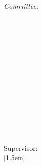 \begin{titlepage}
	\begin{minipage}[t]{.27\textwidth}
		\raggedleft
		\textit{Committee:}
	\end{minipage}
	\hspace*{15pt}
	\begin{minipage}[t]{.65\textwidth}
		{\Large \thesisReviewerOneTitle\ \thesisReviewerOne} \\
	  	{\small \thesisReviewerOneDepartment} \\[-1mm]
		{\small \thesisReviewerOneUniversity}
	\end{minipage} \\[5mm]

	\begin{minipage}[t]{.27\textwidth}
		\raggedleft
		\textit{}
	\end{minipage}
	\hspace*{15pt}
	\begin{minipage}[t]{.65\textwidth}
		{\Large \thesisReviewerTwoTitle\ \thesisReviewerTwo} \\
	  	{\small \thesisReviewerTwoDepartment} \\[-1mm]
		{\small \thesisReviewerTwoUniversity}
	\end{minipage} \\[20mm]

    \centering
	\thesisDate \\

\end{titlepage}


\hfill
\vfill
{
	\small
	\textbf{\thesisAuthor} \\
	\textit{\thesisTitle} \\
    \thesisDate \\
    Supervisor: \thesisSupervisorTitle\ \thesisSupervisor\\
	[1.5em]
	\textbf{\thesisUniversity} \\
	\thesisUniversityInstitute \\
	\thesisUniversityDepartment \\
	\thesisUniversityGroup \\
	\thesisUniversityCity
}
